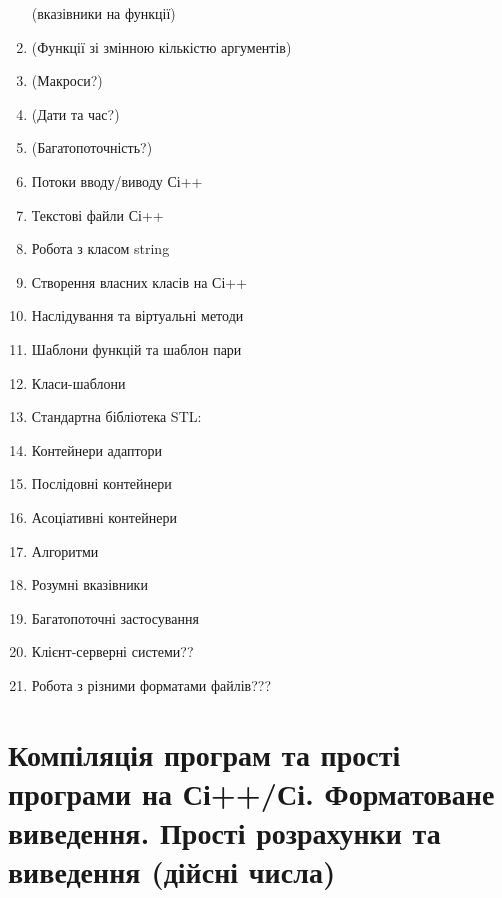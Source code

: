 \documentclass[]{article}
\begin{document}
\begin{enumerate}
(вказівники на функції)
\item
(Функції зі змінною кількістю аргументів)
\item
(Макроси?)
\item
(Дати та час?)
\item
(Багатопоточність?)
\item
Потоки вводу/виводу Сі++
\item
Текстові файли Сі++
\item
Робота з класом string
\item
Створення власних класів на Сі++
\item
Наслідування та віртуальні методи
\item
Шаблони функцій та шаблон пари
\item
Класи-шаблони
\item
Стандартна бібліотека STL:
\item
Контейнери адаптори
\item
Послідовні контейнери
\item
Асоціативні контейнери
\item
Алгоритми
\item
Розумні вказівники
\item
Багатопоточні застосування
\item
Клієнт-серверні системи??
\item
Робота з різними форматами файлів???
\end{enumerate}

\section{Компіляція програм та прості програми на Сі++/Сі. Форматоване виведення.
Прості розрахунки та виведення (дійсні числа)}
\end{document}
